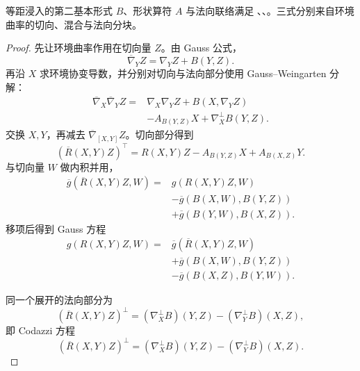 \begin{theorem}
等距浸入的第二基本形式 $B$、形状算符 $A$ 与法向联络满足 、、。三式分别来自环境曲率的切向、混合与法向分块。
\end{theorem}

\begin{proof}
先让环境曲率作用在切向量 $Z$。由 Gauss 公式，
\[
\overline\nabla_YZ
=\nabla_YZ+B(Y,Z).
\]
再沿 $X$ 求环境协变导数，并分别对切向与法向部分使用 Gauss--Weingarten 分解：
\[
\begin{aligned}
\overline\nabla_X\overline\nabla_YZ
={}&\nabla_X\nabla_YZ+B(X,\nabla_YZ)\\
&-A_{B(Y,Z)}X
+\nabla_X^\perp B(Y,Z).
\end{aligned}
\]
交换 $X,Y$，再减去 $\overline\nabla_{[X,Y]}Z$。切向部分得到
\[
(\overline R(X,Y)Z)^\top
=R(X,Y)Z
-A_{B(Y,Z)}X+A_{B(X,Z)}Y.
\]
与切向量 $W$ 做内积并用，
\[
\begin{aligned}
\overline g(\overline R(X,Y)Z,W)
={}&g(R(X,Y)Z,W)\\
&-\overline g(B(X,W),B(Y,Z))\\
&+\overline g(B(Y,W),B(X,Z)).
\end{aligned}
\]
移项后得到 Gauss 方程
\begin{equation}\label{eq:math-dg-gauss-general}
{
\begin{aligned}
g(R(X,Y)Z,W)
={}&\overline g(\overline R(X,Y)Z,W)\\
&+\overline g(B(X,W),B(Y,Z))\\
&-\overline g(B(X,Z),B(Y,W)).
\end{aligned}}
\end{equation}

同一个展开的法向部分为
\[
(\overline R(X,Y)Z)^\perp
=(\nabla_X^\perp B)(Y,Z)
-(\nabla_Y^\perp B)(X,Z),
\]
即 Codazzi 方程
\begin{equation}\label{eq:math-dg-codazzi-general}
{
(\overline R(X,Y)Z)^\perp
=(\nabla_X^\perp B)(Y,Z)
-(\nabla_Y^\perp B)(X,Z).}
\end{equation}


\end{proof}

